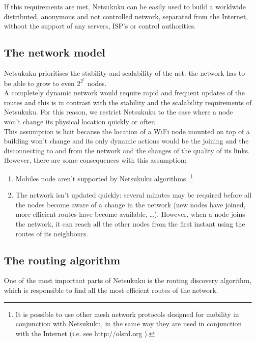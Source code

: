 \documentclass[a4paper]{article}
\newcommand{\href}[2]{ #1 }
\begin{document}
If this requirements are met, Netsukuku can be easily used to build a worldwide
distributed, anonymous and not controlled network, separated from the
Internet, without the support of any servers, ISP's or control authorities.

\subsection{The network model}
\label{sec:net_model}

Netsukuku prioritises the stability and scalability of the net: the network
has to be able to grow to even $2^{2^7}$ nodes.\\

A completely dynamic network would require rapid and frequent updates
of the routes and this is in contrast with the stability and the scalability
requirements of Netsukuku. For this reason, we restrict Netsukuku to the case
where a node won't change its physical location quickly or often.\\

This assumption is licit because the location of a WiFi node mounted on
top of a building won't change and its only dynamic actions would be the
joining and the disconnecting to and from the network and the changes of the
quality of its links.\\

However, there are some consequences with this assumption:
\begin{enumerate}
	\item	Mobiles node aren't supported by Netsukuku algorithms.
		\footnote{It is possible to use other mesh network protocols
		designed for mobility in conjunction with Netsukuku, in the
		same way they are used in conjunction
		with the Internet (i.e. see \href{http://olsrd.org}{olsrd}). }
	\item   The network isn't updated quickly: several minutes may be
		required before all the nodes become aware of a change in the
		network (new nodes have joined, more efficient routes have
		become available, \dots). However, when a node joins
		the network, it can reach all the other nodes from the first
		instant using the routes of its neighbours.
\end{enumerate}

\subsection{The routing algorithm}
One of the most important parts of Netsukuku is the routing discovery
algorithm, which is responsible to find all the most efficient routes of the
network.\\
\end{document}
